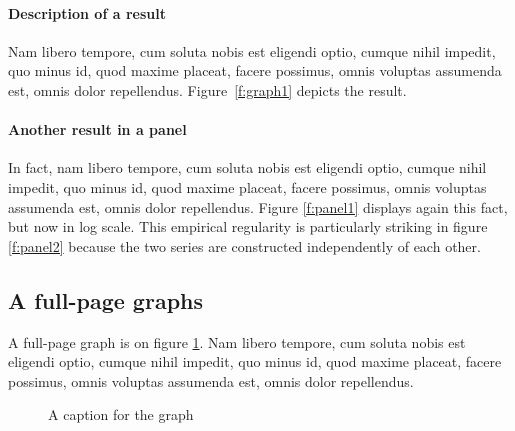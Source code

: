 \documentclass[letterpaper,12pt,leqno]{article}
\newcommand{\pdf}{figures.pdf}
\begin{document}
\paragraph{Description of a result} Nam libero tempore, cum soluta nobis est eligendi optio, cumque nihil impedit, quo minus id, quod maxime placeat, facere possimus, omnis voluptas assumenda est, omnis dolor repellendus. Figure~\ref{f:graph1} depicts the result.

\paragraph{Another result in a panel} In fact, nam libero tempore, cum soluta nobis est eligendi optio, cumque nihil impedit, quo minus id, quod maxime placeat, facere possimus, omnis voluptas assumenda est, omnis dolor repellendus. Figure \ref{f:panel1} displays again this fact, but now in log scale. This empirical regularity is particularly striking in figure \ref{f:panel2} because the two series are constructed independently of each other.

\subsection{A full-page graphs}

A full-page graph is on figure \ref{f:graph2}. Nam libero tempore, cum soluta nobis est eligendi optio, cumque nihil impedit, quo minus id, quod maxime placeat, facere possimus, omnis voluptas assumenda est, omnis dolor repellendus.

\begin{figure}[p]
\hfill
{}\vfig
{}\hfill
{}\vfig
{}\hfill
{}
\caption{A caption for the graph}
\label{f:graph2}\end{figure}
\end{document}
